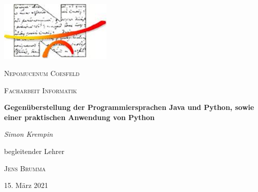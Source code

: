 \begin{titlepage}
	\centering
	\includegraphics[width=0.4\textwidth]{images/logo.png}\par\vspace{1cm}
	{\scshape\LARGE Nepomucenum Coesfeld \par}
	\vspace{1cm}
	{\scshape\Large Facharbeit Informatik\par}
	\vspace{1.5cm}
	{\huge\bfseries Gegenüberstellung der Programmiersprachen Java und Python, sowie einer praktischen Anwendung von Python\par}
	\vspace{2cm}
	{\Large\itshape Simon Krempin\par}
	\vfill
	begleitender Lehrer\par
	\textsc{Jens Brumma}

	\vfill

	{\large 15. März 2021\par}
\end{titlepage}
\clearpage
\tableofcontents
{}
\clearpage
